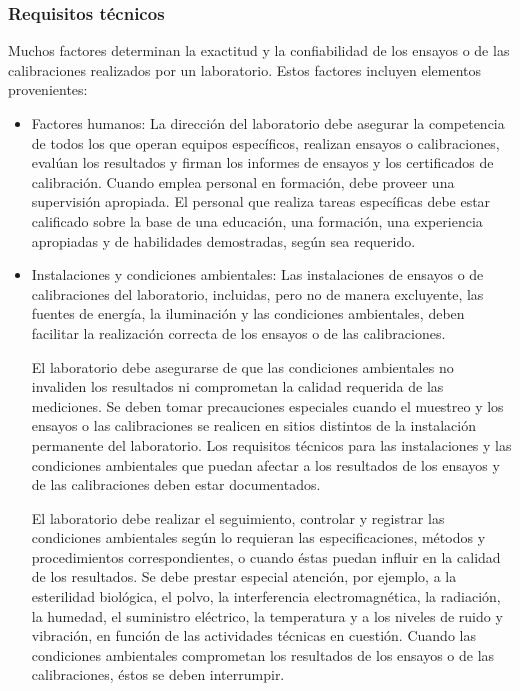 \subsubsection{Requisitos técnicos}
Muchos factores determinan la exactitud y la confiabilidad de los ensayos o de las calibraciones
realizados por un laboratorio. Estos factores incluyen elementos provenientes:

\begin{itemize}
	\item Factores humanos: La dirección del laboratorio debe asegurar la competencia de todos los que operan equipos
	específicos, realizan ensayos o calibraciones, evalúan los resultados y firman los informes de ensayos y los
	certificados de calibración. Cuando emplea personal en formación, debe proveer una supervisión apropiada.
	El personal que realiza tareas específicas debe estar calificado sobre la base de una educación, una
	formación, una experiencia apropiadas y de habilidades demostradas, según sea requerido.
	
	\item Instalaciones y condiciones ambientales: Las instalaciones de ensayos o de calibraciones del laboratorio, incluidas, pero no de manera
	excluyente, las fuentes de energía, la iluminación y las condiciones ambientales, deben facilitar la realización
	correcta de los ensayos o de las calibraciones.
	
	\par \noindent
	El laboratorio debe asegurarse de que las condiciones ambientales no invaliden los resultados ni
	comprometan la calidad requerida de las mediciones. Se deben tomar precauciones especiales cuando el
	muestreo y los ensayos o las calibraciones se realicen en sitios distintos de la instalación permanente del
	laboratorio. Los requisitos técnicos para las instalaciones y las condiciones ambientales que puedan afectar a
	los resultados de los ensayos y de las calibraciones deben estar documentados.
	
	\par \noindent
	El laboratorio debe realizar el seguimiento, controlar y registrar las condiciones ambientales según lo
	requieran las especificaciones, métodos y procedimientos correspondientes, o cuando éstas puedan influir en
	la calidad de los resultados. Se debe prestar especial atención, por ejemplo, a la esterilidad biológica, el polvo,
	la interferencia electromagnética, la radiación, la humedad, el suministro eléctrico, la temperatura y a los
	niveles de ruido y vibración, en función de las actividades técnicas en cuestión. Cuando las condiciones
	ambientales comprometan los resultados de los ensayos o de las calibraciones, éstos se deben interrumpir.
	

\end{itemize}
